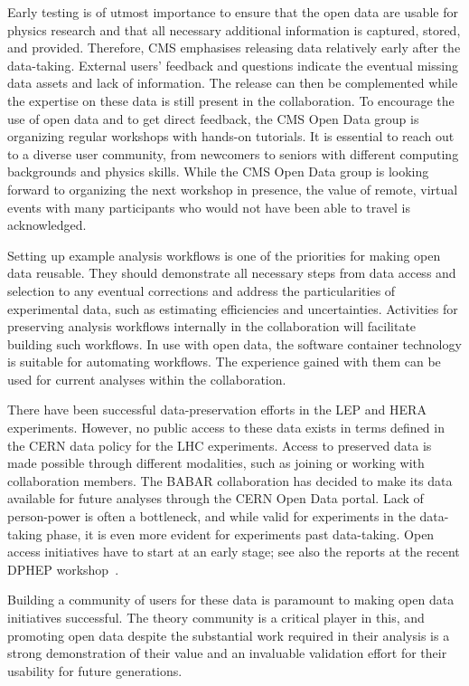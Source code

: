 \documentclass[11pt]{article}
\begin{document}
Early testing is of utmost importance to ensure that the open data are usable for physics research and that all necessary additional information is captured, stored, and provided. Therefore, \gls{CMS} emphasises releasing data relatively early after the data-taking. External users' feedback and questions indicate the eventual missing data assets and lack of information. The release can then be complemented while the expertise on these data is still present in the collaboration. To encourage the use of open data and to get direct feedback, the \gls{CMS} Open Data group is organizing regular workshops with hands-on tutorials. It is essential to reach out to a diverse user community, from newcomers to seniors with different computing backgrounds and physics skills. While the \gls{CMS} Open Data group is looking forward to organizing the next workshop in presence, the value of remote, virtual events with many participants who would not have been able to travel is acknowledged.

Setting up example analysis workflows is one of the priorities for making open data reusable. They should demonstrate all necessary steps from data access and selection to any eventual corrections and address the particularities of experimental data, such as estimating efficiencies and uncertainties. Activities for preserving analysis workflows internally in the collaboration will facilitate building such workflows. In use with open data, the software container technology is suitable for automating workflows. The experience gained with them can be used for current analyses within the collaboration.

There have been successful data-preservation efforts in the \gls{LEP} and \gls{HERA} experiments. However, no public access to these data exists in terms defined in the \gls{CERN} data policy for the \gls{LHC} experiments. Access to preserved data is made possible through different modalities, such as joining or working with collaboration members. The \gls{BABAR} collaboration has decided to make its data available for future analyses through the \gls{CERN} Open Data portal. Lack of person-power is often a bottleneck, and while valid for experiments in the data-taking phase, it is even more evident for experiments past data-taking. Open access initiatives have to start at an early stage; see also the reports at the recent DPHEP workshop~\cite{DPHEPws:2021}.

Building a community of users for these data is paramount to making open data initiatives successful. The theory community is a critical player in this, and promoting open data despite the substantial work required in their analysis is a strong demonstration of their value and an invaluable validation effort for their usability for future generations.
\end{document}
